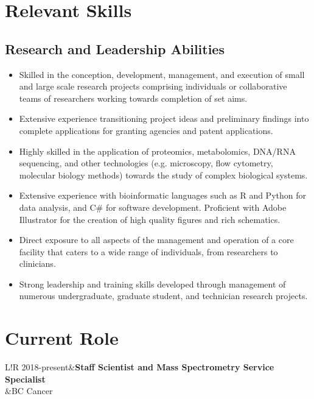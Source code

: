 \documentclass[11pt]{article}
\newcommand\VRule{\color{lightgray}\vrule width 0.5pt}
\begin{document}
\section*{Relevant Skills}
\begin{addmargin}[3em]{2em}%
	\subsection*{Research and Leadership Abilities}
	\begin{itemize}
		\item Skilled in the conception, development, management, and execution of small and large scale research projects comprising individuals or collaborative teams of researchers working towards completion of set aims.
		\item Extensive experience transitioning project ideas and preliminary findings into complete applications for granting agencies and patent applications.
		\item Highly skilled in the application of proteomics, metabolomics, DNA/RNA sequencing, and other technologies (e.g. microscopy, flow cytometry, molecular biology methods) towards the study of complex biological systems.
		\item Extensive experience with bioinformatic languages such as R and Python for data analysis, and C\# for software development. Proficient with Adobe Illustrator for the creation of high quality figures and rich schematics.
		\item Direct exposure to all aspects of the management and operation of a core facility that caters to a wide range of individuals, from researchers to clinicians.
		\item Strong leadership and training skills developed through management of numerous undergraduate, graduate student, and technician research projects.
	\end{itemize}
\end{addmargin}

\section*{Current Role}
\begin{tabular}{L!{\VRule}R}
	2018-present&\textbf{Staff Scientist and Mass Spectrometry Service Specialist}\\
	&BC Cancer\\
\end{tabular}\\
\end{document}

